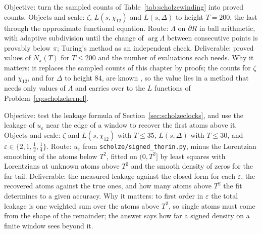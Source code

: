 \begin{compproblem}\label{cp:scholzewinding}
Objective: turn the sampled counts of Table~\ref{tab:scholzewinding} into proved counts. Objects and scale: $\zeta$, $L(s,\chi_{12})$ and $L(s,\Delta)$ to height $T=200$, the last through the approximate functional equation. Route: $\Lambda$ on $\partial R$ in ball arithmetic, with adaptive subdivision until the change of $\arg\Lambda$ between consecutive points is provably below $\pi$; Turing's method \cite{turing1953,booker2006} as an independent check. Deliverable: proved values of $N_\pi(T)$ for $T\le200$ and the number of evaluations each needs. Why it matters: it replaces the sampled counts of this chapter by proofs; the counts for $\zeta$ and $\chi_{12}$, and for $\Delta$ to height $84$, are known \cite{platttrudgian2021,rumely1993,hik2027}, so the value lies in a method that needs only values of $\Lambda$ and carries over to the $L$ functions of Problem~\ref{cp:scholzekernel}.
\end{compproblem}

\begin{compproblem}\label{cp:scholzeleak}
Objective: test the leakage formula of Section~\ref{sec:scholzeclocks}, and use the leakage of $u_\varepsilon$ near the edge of a window to recover the first atoms above it. Objects and scale: $\zeta$ and $L(s,\chi_{12})$ with $T\le35$, $L(s,\Delta)$ with $T\le30$, and $\varepsilon\in\{2,1,\frac12,\frac14\}$. Route: $u_\varepsilon$ from \texttt{scholze/signed\_thorin.py}, minus the Lorentzian smoothing of the atoms below $T^2$, fitted on $(0,T^2]$ by least squares with Lorentzians at unknown atoms above $T^2$ and the smooth density of zeros for the far tail. Deliverable: the measured leakage against the closed form for each $\varepsilon$, the recovered atoms against the true ones, and how many atoms above $T^2$ the fit determines to a given accuracy. Why it matters: to first order in $\varepsilon$ the total leakage is one weighted sum over the atoms above $T^2$, so single atoms must come from the shape of the remainder; the answer says how far a signed density on a finite window sees beyond it.
\end{compproblem}
